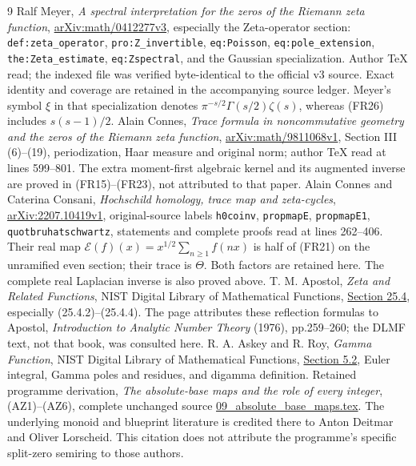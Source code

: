 \documentclass[11pt]{article}
\begin{document}
\begin{thebibliography}{9}
 Ralf Meyer, \emph{A spectral interpretation for the zeros of the Riemann zeta function}, \href{https://arxiv.org/abs/math/0412277v3}{arXiv:math/0412277v3}, especially the Zeta-operator section: \texttt{def:zeta\_operator}, \texttt{pro:Z\_invertible}, \texttt{eq:Poisson}, \texttt{eq:pole\_extension}, \texttt{the:Zeta\_estimate}, \texttt{eq:Zspectral}, and the Gaussian specialization. Author TeX read; the indexed file was verified byte-identical to the official v3 source. Exact identity and coverage are retained in the accompanying source ledger. Meyer's symbol $\xi$ in that specialization denotes $\pi^{-s/2}\Gamma(s/2)\zeta(s)$, whereas (FR26) includes $s(s-1)/2$.
 Alain Connes, \emph{Trace formula in noncommutative geometry and the zeros of the Riemann zeta function}, \href{https://arxiv.org/abs/math/9811068v1}{arXiv:math/9811068v1}, Section III (6)--(19), periodization, Haar measure and original norm; author TeX read at lines 599--801. The extra moment-first algebraic kernel and its augmented inverse are proved in (FR15)--(FR23), not attributed to that paper.
 Alain Connes and Caterina Consani, \emph{Hochschild homology, trace map and zeta-cycles}, \href{https://arxiv.org/abs/2207.10419v1}{arXiv:2207.10419v1}, original-source labels \texttt{h0coinv}, \texttt{propmapE}, \texttt{propmapE1}, \texttt{quotbruhatschwartz}, statements and complete proofs read at lines 262--406. Their real map $\mathcal E(f)(x)=x^{1/2}\sum_{n\ge1}f(nx)$ is half of (FR21) on the unramified even section; their trace is $\Theta$. Both factors are retained here. The complete real Laplacian inverse is also proved above.
 T. M. Apostol, \emph{Zeta and Related Functions}, NIST Digital Library of Mathematical Functions, \href{https://dlmf.nist.gov/25.4}{Section 25.4}, especially (25.4.2)--(25.4.4). The page attributes these reflection formulas to Apostol, \emph{Introduction to Analytic Number Theory} (1976), pp.259--260; the DLMF text, not that book, was consulted here.
 R. A. Askey and R. Roy, \emph{Gamma Function}, NIST Digital Library of Mathematical Functions, \href{https://dlmf.nist.gov/5.2}{Section 5.2}, Euler integral, Gamma poles and residues, and digamma definition.
 Retained programme derivation, \emph{The absolute-base maps and the role of every integer}, (AZ1)--(AZ6), complete unchanged source \href{https://github.com/KokunoYumeto/zeta-function-research-reader/blob/44d03e48849934edf59f645cb5021b639ab31ac4/workbenches/splitzero-tandem/continuations/20260923-original-zeta-return/sources/09_absolute_base_maps.tex}{09\_absolute\_base\_maps.tex}. The underlying monoid and blueprint literature is credited there to Anton Deitmar and Oliver Lorscheid. This citation does not attribute the programme's specific split-zero semiring to those authors.

\end{thebibliography}
\end{document}
